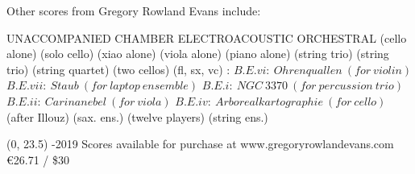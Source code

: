 \documentclass[10pt]{article}
\begin{document}

\begin{center}
\fontsize{.7cm}{1em}\selectfont Other scores from Gregory Rowland Evans include: \hfill
\end{center}
\vspace*{4\baselineskip}
{
\begin{center}
\setlength{\columnseprule}{1pt}
\setlength{\columnsep}{6em}

\begin{paracol}{4}
\fontsize{.4cm}{1em}\selectfont UNACCOMPANIED
\switchcolumn[1]
\fontsize{.4cm}{1em}\selectfont CHAMBER
\switchcolumn[2]
\fontsize{.4cm}{1em}\selectfont ELECTROACOUSTIC
\switchcolumn[3]
\fontsize{.4cm}{1em}\selectfont ORCHESTRAL
\switchcolumn[0]
\fontsize{.1cm}{0.5em}  (cello alone)
\switchcolumn[0]
\hfill
\switchcolumn[0]
\fontsize{.1cm}{0.5em}  (solo cello)
\switchcolumn[0]
\hfill
 \switchcolumn[0]
\fontsize{.1cm}{0.5em}  (xiao alone)
\switchcolumn[0]
\hfill
\switchcolumn[0]
\fontsize{.1cm}{0.5em}  (viola alone)
\switchcolumn[0]
\hfill
\switchcolumn[0]
\fontsize{.1cm}{0.5em}  (piano alone)
\switchcolumn[1]
\fontsize{.1cm}{0.5em} 
\switchcolumn[1]
\hfill
\switchcolumn[1]
\fontsize{.1cm}{0.5em}  (string trio)
\switchcolumn[1]
\hfill
\switchcolumn[1]
\fontsize{.1cm}{0.5em}  (string trio)
\switchcolumn[1]
\hfill
\switchcolumn[1]
\fontsize{.1cm}{0.5em}  (string quartet)
\switchcolumn[1]
\hfill
\switchcolumn[1]
\fontsize{.1cm}{0.5em}  (two cellos)
\switchcolumn[1]
\hfill
\switchcolumn[1]
\fontsize{.1cm}{0.5em}  (fl, sx, vc)
\switchcolumn[2]
\fontsize{.1cm}{0.5em} :
\switchcolumn[2]
\fontsize{.05cm}{0.5em}  $B.E.vi: \ Ohrenquallen \ (for \ violin)$
\switchcolumn[2]
\fontsize{.05cm}{0.5em}  $B.E.vii: \ Staub \ (for \ laptop \ ensemble)$
\switchcolumn[2]
\fontsize{.05cm}{0.5em}  $B.E.i: \ NGC \ 3370 \ (for \ percussion \ trio)$
\switchcolumn[2]
\fontsize{.05cm}{0.5em}  $B.E.ii: \ Carinanebel \ (for \ viola)$
\switchcolumn[2]
 \fontsize{.05cm}{0.5em} $B.E.iv: \ Arborealkartographie \ (for \ cello)$
\switchcolumn[3]
\fontsize{.1cm}{0.5em}  (after Illouz)
\switchcolumn[3]
\hfill
\switchcolumn[3]
\fontsize{.1cm}{0.5em}  (sax. ens.)
\switchcolumn[3]
\hfill
\switchcolumn[3]
\fontsize{.1cm}{0.5em}  (twelve players)
\switchcolumn[3]
\hfill
\switchcolumn[3]
\fontsize{.1cm}{0.5em}  (string ens.)


\end{paracol}
\end{center}
}

\begin{textblock}{23}(0, 23.5)
-2019 \hfill
Scores available for purchase at www.gregoryrowlandevans.com \hfill
\euro 26.71 / \$30
\end{textblock}
\end{document}
